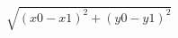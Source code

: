 \documentclass[11pt]{article}
\begin{document}
\[
\sqrt{(x0 - x1)^2 + (y0 - y1)^2}
\]
\end{document}
